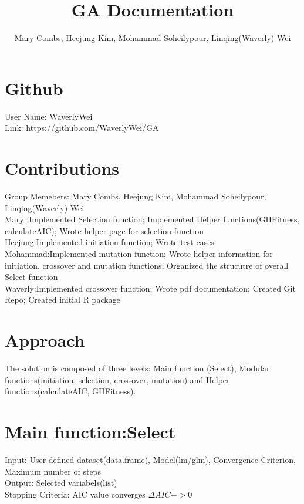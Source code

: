 \documentclass{article}\usepackage[]{graphicx}\usepackage[]{color}
\begin{document}
\title{GA Documentation}
\author{Mary Combs, Heejung Kim, Mohammad Soheilypour, Linqing(Waverly) Wei}
\maketitle

\section{Github}
User Name: WaverlyWei\\
Link: https://github.com/WaverlyWei/GA
\section{Contributions}
Group Memebers: Mary Combs, Heejung Kim, Mohammad Soheilypour, Linqing(Waverly) Wei\\

Mary: Implemented Selection function; Implemented Helper functions(GHFitness, calculateAIC); Wrote helper page for selection function\\

Heejung:Implemented initiation function; Wrote test cases\\

Mohammad:Implemented mutation function; Wrote helper information for initiation, crossover and mutation functions; Organized the strucutre of overall Select function\\

Waverly:Implemented crossover function; Wrote pdf documentation; Created Git Repo; Created initial R package
\section{Approach}
The solution is composed of three levels: Main function (Select), Modular functions(initiation, selection, crossover, mutation) and Helper functions(calculateAIC, GHFitness). \\
\section{Main function:Select}
Input: User defined dataset(data.frame), Model(lm/glm), Convergence Criterion, Maximum number of steps\\
Output: Selected variabels(list)\\
Stopping Criteria: AIC value converges \(\Delta AIC -> 0\)\\
\end{document}
